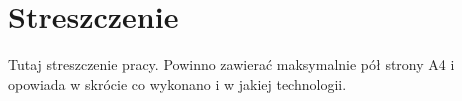 \chapter*{Streszczenie}
\label{cha:streszczenie}
\makeatletter
{}
Tutaj streszczenie pracy. Powinno zawierać maksymalnie pół strony A4 i opowiada w skrócie co wykonano i w jakiej technologii.